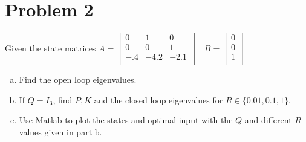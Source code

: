 \documentclass{article}
\begin{document}
\newpage
\section*{Problem 2}

Given the state matrices
$A =
\begin{bmatrix}
0 & 1 & 0 \\
0 & 0 & 1 \\
-.4 & -4.2 & -2.1 \\
\end{bmatrix}
\quad
B =
\begin{bmatrix}
0 \\
0 \\
1 \\
\end{bmatrix}
$

\begin{enumerate}[a.]
\item Find the open loop eigenvalues.
\newline

\item If $Q = I_3$, find $P, K$ and the closed loop eigenvalues for $R \in \{0.01, 0.1, 1\}$.
\newline

\item Use Matlab to plot the states and optimal input with the $Q$ and different $R$ values given in part b.
\newline

\end{enumerate}
\end{document}
